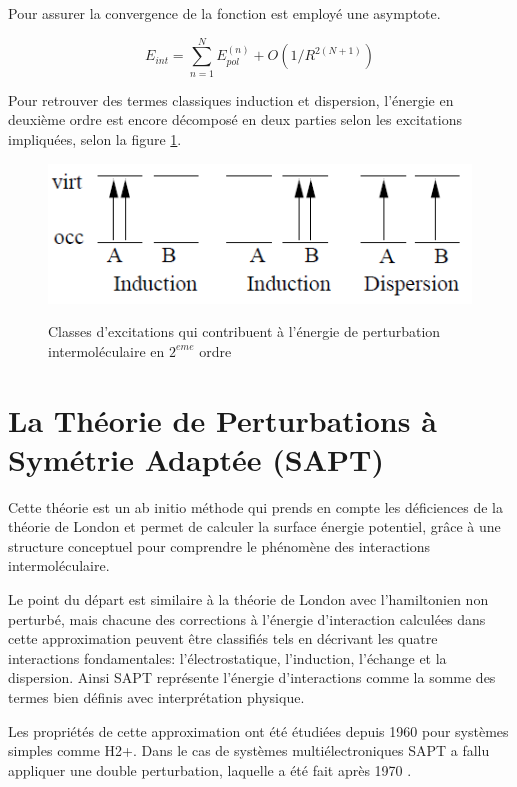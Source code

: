 Pour assurer la convergence de la fonction est employé une asymptote. 

\begin{equation}
E_{int} = \sum_{n=1}^{N} E_{pol}^{(n)} + O(1/R^{2 (N+1)})
\end{equation}

 Pour retrouver des termes classiques induction et dispersion, l'énergie en deuxième ordre est encore décomposé en deux parties selon les excitations impliquées, selon la figure \ref{figExc}.

\singlespacing
\begin{figure}[H]
	\centering
	\includegraphics[scale=0.7]{image/D-I} \label{figExc}
	\caption[Les excitations contribuent à l'énergie
	de perturbation intermoléculaire en $2^{eme}$ ordre]{Classes d'excitations qui contribuent à l'énergie
		de perturbation intermoléculaire en $2^{eme}$ ordre}
\end{figure}



\section{La Théorie de Perturbations à Symétrie Adaptée (SAPT)}


Cette théorie est un ab initio méthode qui prends en compte les déficiences de la théorie de London et permet de calculer la surface énergie potentiel, grâce à une structure conceptuel pour comprendre le phénomène des interactions intermoléculaire. 

Le point du départ est similaire à la théorie de London avec l'hamiltonien non perturbé, mais chacune des corrections à l’énergie d’interaction calculées dans cette approximation peuvent être classifiés tels en décrivant les quatre interactions fondamentales: l’électrostatique,  l’induction, l’échange et la dispersion. Ainsi SAPT représente l’énergie d’interactions comme la somme des termes bien définis avec interprétation physique. 

Les propriétés de cette approximation ont été étudiées depuis 1960 pour systèmes simples comme H2+. Dans le cas de systèmes multiélectroniques SAPT a fallu appliquer une double perturbation, laquelle a été fait après 1970 \cite{szalewicz1979symmetry}. 

